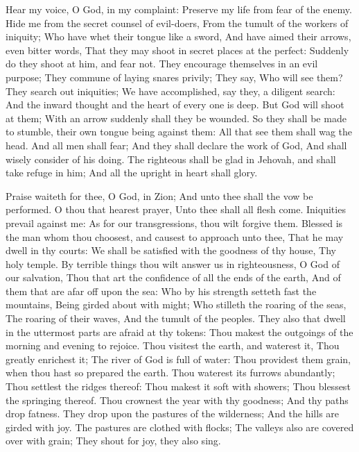 Hear my voice, O God, in my complaint: Preserve my life from fear of the enemy.  Hide me from the secret counsel of evil-doers, From the tumult of the workers of iniquity;  Who have whet their tongue like a sword, And have aimed their arrows, even bitter words,  That they may shoot in secret places at the perfect: Suddenly do they shoot at him, and fear not.  They encourage themselves in an evil purpose; They commune of laying snares privily; They say, Who will see them?  They search out iniquities; We have accomplished, say they, a diligent search: And the inward thought and the heart of every one is deep.  But God will shoot at them; With an arrow suddenly shall they be wounded.  So they shall be made to stumble, their own tongue being against them: All that see them shall wag the head.  And all men shall fear; And they shall declare the work of God, And shall wisely consider of his doing.  The righteous shall be glad in Jehovah, and shall take refuge in him; And all the upright in heart shall glory. 

Praise waiteth for thee, O God, in Zion; And unto thee shall the vow be performed.  O thou that hearest prayer, Unto thee shall all flesh come.  Iniquities prevail against me: As for our transgressions, thou wilt forgive them.  Blessed is the man whom thou choosest, and causest to approach unto thee, That he may dwell in thy courts: We shall be satisfied with the goodness of thy house, Thy holy temple.  By terrible things thou wilt answer us in righteousness, O God of our salvation, Thou that art the confidence of all the ends of the earth, And of them that are afar off upon the sea:  Who by his strength setteth fast the mountains, Being girded about with might;  Who stilleth the roaring of the seas, The roaring of their waves, And the tumult of the peoples.  They also that dwell in the uttermost parts are afraid at thy tokens: Thou makest the outgoings of the morning and evening to rejoice.  Thou visitest the earth, and waterest it, Thou greatly enrichest it; The river of God is full of water: Thou providest them grain, when thou hast so prepared the earth.  Thou waterest its furrows abundantly; Thou settlest the ridges thereof: Thou makest it soft with showers; Thou blessest the springing thereof.  Thou crownest the year with thy goodness; And thy paths drop fatness.  They drop upon the pastures of the wilderness; And the hills are girded with joy.  The pastures are clothed with flocks; The valleys also are covered over with grain; They shout for joy, they also sing. 

